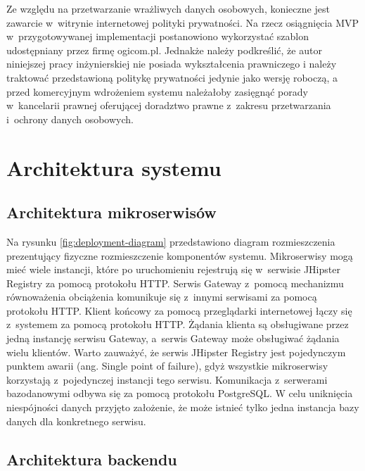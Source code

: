 \par
Ze względu na przetwarzanie wrażliwych danych osobowych, konieczne jest zawarcie w~witrynie internetowej polityki prywatności.
Na rzecz osiągnięcia MVP w~przygotowywanej implementacji postanowiono wykorzystać szablon udostępniany przez firmę ogicom.pl\cite{url:ogicom-privacy-policy}.
Jednakże należy podkreślić, że autor niniejszej pracy inżynierskiej nie posiada wykształcenia prawniczego
i należy traktować przedstawioną politykę prywatności jedynie jako wersję roboczą,
a przed komercyjnym wdrożeniem systemu należałoby zasięgnąć porady w~kancelarii prawnej oferującej doradztwo prawne z~zakresu przetwarzania i~ochrony danych osobowych.

\section{Architektura systemu}\label{sec:system-architecture}
\subsection{Architektura mikroserwisów}\label{subsec:system-architecture:microservices}

\noindent
{}

Na rysunku \ref{fig:deployment-diagram} przedstawiono diagram rozmieszczenia prezentujący fizyczne rozmieszczenie komponentów systemu.
Mikroserwisy mogą mieć wiele instancji, które po uruchomieniu rejestrują się w~serwisie JHipster Registry za pomocą protokołu HTTP.
Serwis Gateway z~pomocą mechanizmu równoważenia obciążenia komunikuje się z~innymi serwisami za pomocą protokołu HTTP.
Klient końcowy za pomocą przeglądarki internetowej łączy się z~systemem za pomocą protokołu HTTP.
Żądania klienta są obsługiwane przez jedną instancję serwisu Gateway, a~serwis Gateway może obsługiwać żądania wielu klientów.
Warto zauważyć, że serwis JHipster Registry jest pojedynczym punktem awarii (ang. Single point of failure), gdyż wszystkie mikroserwisy korzystają z~pojedynczej instancji tego serwisu.
Komunikacja z~serwerami bazodanowymi odbywa się za pomocą protokołu PostgreSQL.
W celu uniknięcia niespójności danych przyjęto założenie, że może istnieć tylko jedna instancja bazy danych dla konkretnego serwisu.

\subsection{Architektura backendu}\label{subsec:system-architecture:backend}

